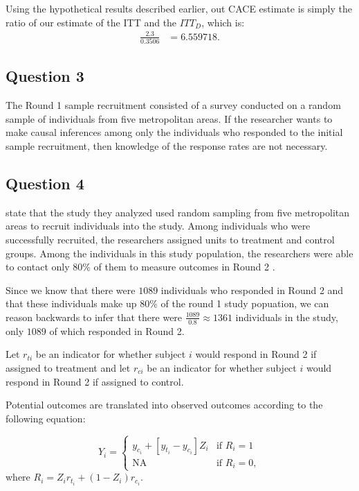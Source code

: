 \documentclass[11pt]{article}\usepackage[]{graphicx}\usepackage[]{color}
\theoremstyle{newstyle}
\begin{document}
Using the hypothetical results described earlier, out CACE estimate is simply the ratio of our estimate of the ITT and the $ITT_D$, which is:
\begin{align*}
\frac{2.3}{0.3506} & = 6.559718.
\end{align*}

\subsection{Question 3}

The Round 1 sample recruitment consisted of a survey conducted on a random sample of individuals from five metropolitan areas. If the researcher wants to make causal inferences among only the individuals who responded to the initial sample recruitment, then knowledge of the response rates are not necessary.

\subsection{Question 4}

\citet{albertsonlawrence2009} state that the study they analyzed used random sampling from five metropolitan areas to recruit individuals into the study. Among individuals who were successfully recruited, the researchers assigned units to treatment and control groups. Among the individuals in this study population, the researchers were able to contact only 80\% of them to measure outcomes in Round 2 \citep[284]{albertsonlawrence2009}.

Since we know that there were $1089$ individuals who responded in Round 2 and that these individuals make up 80\% of the round 1 study popuation, we can reason backwards to infer that there were $\frac{1089}{0.8} \approx 1361$ individuals in the study, only $1089$ of which responded in Round 2.

Let $r_{ti}$ be an indicator for whether subject $i$ would respond in Round 2 if assigned to treatment and let $r_{ci}$ be an indicator for whether subject $i$ would respond in Round 2 if assigned to control.

Potential outcomes are translated into observed outcomes according to the following equation:

\begin{equation}
\label{eq:obs_outcomes}
Y_i = \begin{cases} y_{c_i} + [y_{t_i} - y_{c_i}] Z_i & \text{if } R_i = 1 \\
\text{NA} & \text{if } R_i = 0, \end{cases}
\end{equation}
where $R_i = Z_i r_{t_i} + \left(1 - Z_i\right) r_{c_i}$.
\end{document}
